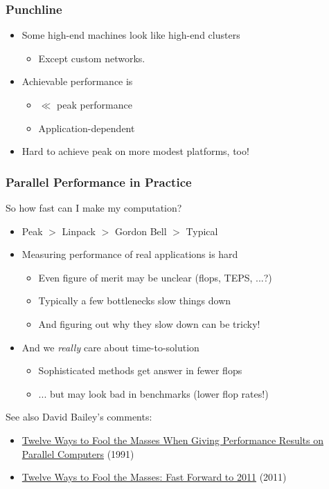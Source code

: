 \documentclass{beamer}
\begin{document}
\begin{frame}
  \frametitle{Punchline}

  \begin{itemize}
  \item Some high-end machines look like high-end clusters
    \begin{itemize}
    \item Except custom networks.
    \end{itemize}
  \item Achievable performance is
    \begin{itemize}
    \item $\ll$ peak performance
    \item Application-dependent
    \end{itemize}
  \item Hard to achieve peak on more modest platforms, too!
  \end{itemize}
\end{frame}


\begin{frame}
  \frametitle{Parallel Performance in Practice}

  So how fast can I make my computation?
  \begin{itemize}
  \item Peak $ > $ Linpack $ > $ Gordon Bell $ > $ Typical
  \item Measuring performance of real applications is hard
    \begin{itemize}
    \item Even figure of merit may be unclear (flops, TEPS, ...?)
    \item Typically a few bottlenecks slow things down
    \item And figuring out why they slow down can be tricky!
    \end{itemize}
  \item And we {\em really} care about time-to-solution
    \begin{itemize}
    \item Sophisticated methods get answer in fewer flops
    \item ... but may look bad in benchmarks (lower flop rates!)
    \end{itemize}
  \end{itemize}

  \vspace{7mm}
  See also David Bailey's comments:
  \begin{itemize}
  \item \href{http://crd.lbl.gov/~dhbailey/dhbpapers/twelve-ways.pdf}{\small Twelve Ways to Fool the Masses When Giving Performance Results on Parallel Computers} (1991)
  \item \href{http://crd.lbl.gov/~dhbailey/dhbtalks/dhb-12ways.pdf}{\small Twelve Ways to Fool the Masses: Fast Forward to 2011} (2011)
  \end{itemize}
\end{frame}
\end{document}
